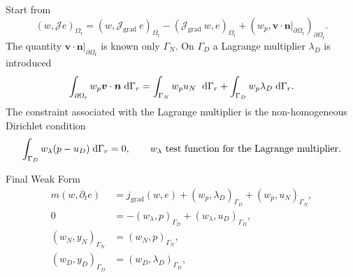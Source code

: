 \documentclass[aspectratio=169]{ISAE-Beamer}
\begin{document}
\begin{frame}
Start from 
\begin{equation*}
\left(w, \mathcal{J} e \right)_{\Omega_{\text{r}}} = \left(w, \mathcal{J}_{\text{grad}} \ e \right)_{\Omega_{\text{r}}} - \left(\mathcal{J}_{\text{grad}} \ w, e \right)_{\Omega_{\text{r}}} + \left(w_p, \bm{v}\cdot\bm{n}\vert_{\partial \Omega_{\text{r}}} \right)_{\partial \Omega_{\text{r}}}.
\end{equation*}
	The quantity $\bm{v}\cdot\bm{n}\vert_{\partial \Omega_{\text{r}}}$ is known only $\Gamma_N$. On $\Gamma_D$ a Lagrange multiplier $\lambda_D$ is introduced 
	\begin{equation}
	\label{eq:bdint_dae}
	\int_{\partial \Omega_{\text{r}}} w_p \bm{v} \cdot \bm{n} \d{\Gamma_r} = \int_{\Gamma_N} w_p u_N \ \d{\Gamma_r} + \int_{\Gamma_D} w_p \lambda_D \d{\Gamma_r}.
	\end{equation}
	The constraint associated with the Lagrange multiplier  is the non-homogeneous Dirichlet condition
	\begin{equation}
	\label{eq:wf_con}
	\int_{\Gamma_D} w_\lambda (p - u_D) \d{\Gamma_r} = 0, \qquad \text{$w_\lambda$ test function for the Lagrange multiplier.}
	\end{equation}
	
	\begin{block}{Final Weak Form}
	\begin{equation*}
\begin{aligned}
m(w, \partial_t{e}) &= j_{\text{grad}}(w, e) + \left(w_p, \lambda_D \right)_{\Gamma_D} + \left(w_p, u_N \right)_{\Gamma_N}, \\
0 &= - \left(w_\lambda, p \right)_{\Gamma_D} + \left(w_\lambda, u_D \right)_{\Gamma_D}, \\
\left(w_N, y_N \right)_{\Gamma_N} &= \left(w_N, p \right)_{\Gamma_N}, \\
\left(w_D, y_D \right)_{\Gamma_D} &= \left(w_D, \lambda_D \right)_{\Gamma_D}, 
\end{aligned}
\end{equation*}
	\end{block}


\end{frame}
\end{document}
